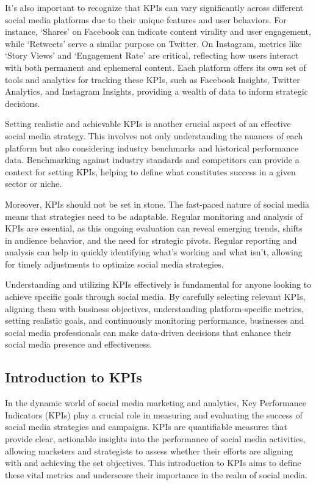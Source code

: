 \documentclass[
]{book}
\begin{document}
It's also important to recognize that KPIs can vary significantly across different social media platforms due to their unique features and user behaviors. For instance, `Shares' on Facebook can indicate content virality and user engagement, while `Retweets' serve a similar purpose on Twitter. On Instagram, metrics like `Story Views' and `Engagement Rate' are critical, reflecting how users interact with both permanent and ephemeral content. Each platform offers its own set of tools and analytics for tracking these KPIs, such as Facebook Insights, Twitter Analytics, and Instagram Insights, providing a wealth of data to inform strategic decisions.

Setting realistic and achievable KPIs is another crucial aspect of an effective social media strategy. This involves not only understanding the nuances of each platform but also considering industry benchmarks and historical performance data. Benchmarking against industry standards and competitors can provide a context for setting KPIs, helping to define what constitutes success in a given sector or niche.

Moreover, KPIs should not be set in stone. The fast-paced nature of social media means that strategies need to be adaptable. Regular monitoring and analysis of KPIs are essential, as this ongoing evaluation can reveal emerging trends, shifts in audience behavior, and the need for strategic pivots. Regular reporting and analysis can help in quickly identifying what's working and what isn't, allowing for timely adjustments to optimize social media strategies.

Understanding and utilizing KPIs effectively is fundamental for anyone looking to achieve specific goals through social media. By carefully selecting relevant KPIs, aligning them with business objectives, understanding platform-specific metrics, setting realistic goals, and continuously monitoring performance, businesses and social media professionals can make data-driven decisions that enhance their social media presence and effectiveness.

\hypertarget{introduction-to-kpis}{%
\subsection*{Introduction to KPIs}\label{introduction-to-kpis}}

In the dynamic world of social media marketing and analytics, Key Performance Indicators (KPIs) play a crucial role in measuring and evaluating the success of social media strategies and campaigns. KPIs are quantifiable measures that provide clear, actionable insights into the performance of social media activities, allowing marketers and strategists to assess whether their efforts are aligning with and achieving the set objectives. This introduction to KPIs aims to define these vital metrics and underscore their importance in the realm of social media.
\end{document}
